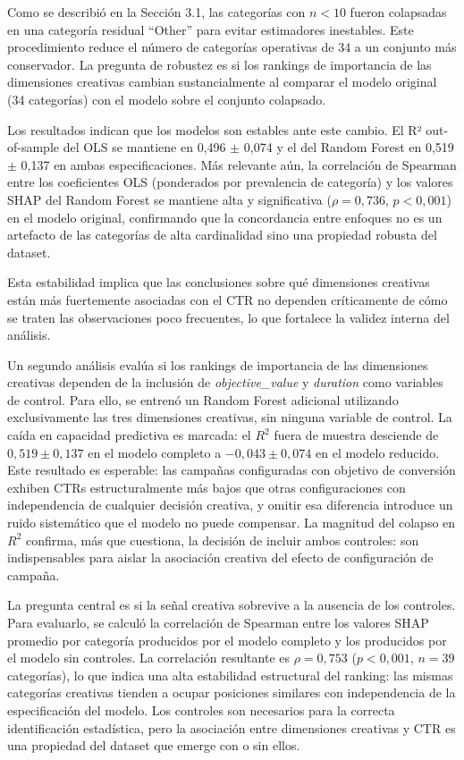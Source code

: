 \documentclass[12pt, a4paper]{report}
\begin{document}
Como se describió en la Sección 3.1, las categorías con $n < 10$ fueron colapsadas en una
categoría residual ``Other'' para evitar estimadores inestables. Este procedimiento reduce
el número de categorías operativas de 34 a un conjunto más conservador. La pregunta de
robustez es si los rankings de importancia de las dimensiones creativas cambian
sustancialmente al comparar el modelo original (34 categorías) con el modelo sobre el
conjunto colapsado.

Los resultados indican que los modelos son estables ante este cambio. El R² out-of-sample
del OLS se mantiene en 0{,}496 $\pm$ 0{,}074 y el del Random Forest en 0{,}519 $\pm$
0{,}137 en ambas especificaciones. Más relevante aún, la correlación de Spearman entre los
coeficientes OLS (ponderados por prevalencia de categoría) y los valores SHAP del Random
Forest se mantiene alta y significativa ($\rho = 0{,}736$, $p < 0{,}001$) en el modelo
original, confirmando que la concordancia entre enfoques no es un artefacto de las
categorías de alta cardinalidad sino una propiedad robusta del dataset.

Esta estabilidad implica que las conclusiones sobre qué dimensiones creativas están más
fuertemente asociadas con el CTR no dependen críticamente de cómo se traten las observaciones
poco frecuentes, lo que fortalece la validez interna del análisis.

Un segundo análisis evalúa si los rankings de importancia de las dimensiones creativas
dependen de la inclusión de \textit{objective\_value} y \textit{duration} como variables
de control. Para ello, se entrenó un Random Forest adicional utilizando exclusivamente las
tres dimensiones creativas, sin ninguna variable de control. La caída en capacidad
predictiva es marcada: el $R^2$ fuera de muestra desciende de $0{,}519 \pm 0{,}137$
en el modelo completo a $-0{,}043 \pm 0{,}074$ en el modelo reducido. Este resultado
es esperable: las campañas configuradas con objetivo de conversión exhiben CTRs
estructuralmente más bajos que otras configuraciones con independencia de cualquier
decisión creativa, y omitir esa diferencia introduce un ruido sistemático que el modelo
no puede compensar. La magnitud del colapso en $R^2$ confirma, más que cuestiona, la
decisión de incluir ambos controles: son indispensables para aislar la asociación creativa
del efecto de configuración de campaña.

La pregunta central es si la señal creativa sobrevive a la ausencia de los controles.
Para evaluarlo, se calculó la correlación de Spearman entre los valores SHAP promedio
por categoría producidos por el modelo completo y los producidos por el modelo sin
controles. La correlación resultante es $\rho = 0{,}753$ ($p < 0{,}001$,
$n = 39$ categorías), lo que indica una alta estabilidad estructural del ranking: las
mismas categorías creativas tienden a ocupar posiciones similares con independencia de la
especificación del modelo. Los controles son necesarios para la correcta identificación
estadística, pero la asociación entre dimensiones creativas y CTR es una propiedad del
dataset que emerge con o sin ellos.
\end{document}
